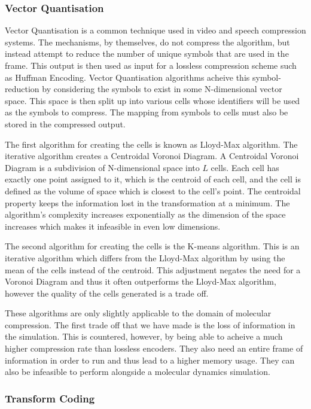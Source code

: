 \documentclass[twocolumn, a4paper,10pt]{article}
\begin{document}
\subsubsection*{Vector Quantisation}

Vector Quantisation is a common technique used in video and speech compression systems.\cite{RefWorks:1} The mechanisms, by themselves, do not compress the algorithm, but instead attempt to reduce the number of unique symbols that are used in the frame. This output is then used as input for a lossless compression scheme such as Huffman Encoding. Vector Quantisation algorithms acheive this symbol-reduction by considering the symbols to exist in some N-dimensional vector space. This space is then split up into various cells whose identifiers will be used as the symbols to compress. The mapping from symbols to cells must also be stored in the compressed output.

The first algorithm for creating the cells is known as Lloyd-Max algorithm.\cite{108235} The iterative algorithm creates a Centroidal Voronoi Diagram. A Centroidal Voronoi Diagram is a subdivision of N-dimensional space into $L$ cells. Each cell has exactly one point assigned to it, which is the centroid of each cell, and the cell is defined as the volume of space which is closest to the cell's point. The centroidal property keeps the information lost in the transformation at a minimum.\cite{RefWorks:1} The algorithm's complexity increases exponentially as the dimension of the space increases which makes it infeasible in even low dimensions.\cite{116880}

The second algorithm for creating the cells is the K-means algorithm.\cite{1979} This is an iterative algorithm which differs from the Lloyd-Max algorithm by using the mean of the cells instead of the centroid. This adjustment negates the need for a Voronoi Diagram and thus it often outperforms the Lloyd-Max algorithm, however the quality of the cells generated is a trade off.

These algorithms are only slightly applicable to the domain of molecular compression. The first trade off that we have made is the loss of information in the simulation. This is countered, however, by being able to acheive a much higher compression rate than lossless encoders. They also need an entire frame of information in order to run and thus lead to a higher memory usage. They can also be infeasible to perform alongside a molecular dynamics simulation.

\subsubsection*{Transform Coding}
\end{document}
